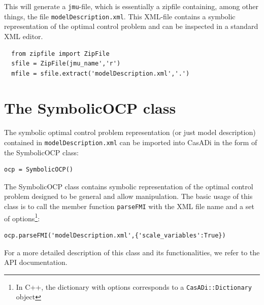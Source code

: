 \documentclass[a4paper,12pt]{book}
\begin{document}
{This will generate a \texttt{jmu}-file, which is essentially a zipfile containing, among other things, the file \texttt{modelDescription.xml}. This XML-file contains a symbolic representation of the optimal control problem and can be inspected in a standard XML editor.
\begin{verbatim}
  from zipfile import ZipFile
  sfile = ZipFile(jmu_name','r')
  mfile = sfile.extract('modelDescription.xml','.')
\end{verbatim}

\section{The SymbolicOCP class} \label{sec:modelica_import}
The symbolic optimal control problem representation (or just model description) contained in \texttt{modelDescription.xml} can be imported into CasADi in the form of the SymbolicOCP class:
\begin{verbatim}
ocp = SymbolicOCP()
\end{verbatim}

The SymbolicOCP class contains symbolic representation of the optimal control problem designed to be general and allow manipulation. The basic usage of this class is to call the member function \texttt{parseFMI} with the XML file name and a set of options\footnote{In C++, the dictionary with options corresponds to a \texttt{CasADi::Dictionary} object}:
\begin{verbatim}
ocp.parseFMI('modelDescription.xml',{'scale_variables':True})
\end{verbatim}

For a more detailed description of this class and its functionalities, we refer to the API documentation.

}
\end{document}
